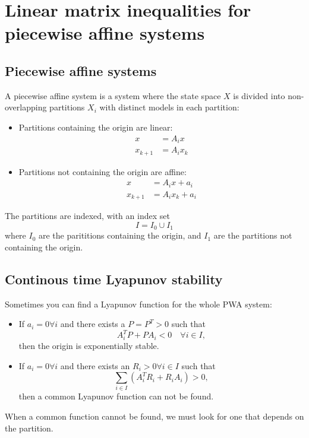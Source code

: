 \section{Linear matrix inequalities for piecewise affine systems}

\subsection{Piecewise affine systems}
A piecewise affine system is a system where the state space $X$ is divided into non-overlapping partitions $X_i$ with distinct models in each partition:
%
\begin{itemize}
  \item Partitions containing the origin are linear:
  \begin{equation}
    \begin{split}
      x &= A_i x \\
      x_{k+1} &= A_i x_k
    \end{split}
  \end{equation}
  \item Partitions not containing the origin are affine:
  \begin{equation}
    \begin{split}
      x &= A_i x + a_i \\
      x_{k+1} &= A_i x_k + a_i
    \end{split}
  \end{equation}
\end{itemize}
%
The partitions are indexed, with an index set
%
\begin{equation}
  I = I_0 \cup I_1
\end{equation}
%
where $I_0$ are the parititions containing the origin, and $I_1$ are the partitions not containing the origin.

\subsection{Continous time Lyapunov stability}
Sometimes you can find a Lyapunov function for the whole PWA system:
%
\begin{itemize}
  \item If $a_i = 0 \forall i$ and there exists a $P = P^T > 0$ such that
  \begin{equation}
    A_i^T P + P A_i < 0 \quad \forall i \in I,
  \end{equation}
  then the origin is exponentially stable.
  \item If $a_i = 0 \forall i$ and there exists an $R_i > 0 \forall i \in I$ such that
  \begin{equation}
    \sum_{i \in I} (A_i^T R_i + R_i A_i) > 0,
  \end{equation}
  then a common Lyapunov function can not be found.
\end{itemize}
%
When a common function cannot be found, we must look for one that depends on the partition.

